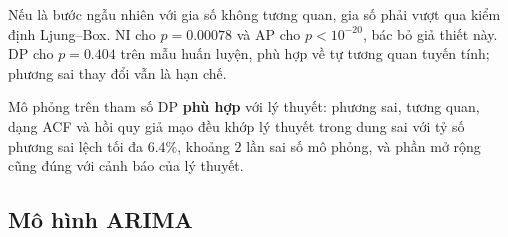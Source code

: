 Nếu là bước ngẫu nhiên với gia số không tương quan, gia số phải vượt qua kiểm định Ljung--Box. NI cho $p=0.00078$ và AP cho $p<10^{-20}$, bác bỏ giả thiết này. DP cho $p=0.404$ trên mẫu huấn luyện, phù hợp về tự tương quan tuyến tính; phương sai thay đổi vẫn là hạn chế.

 Mô phỏng trên tham số DP \textbf{phù hợp} với lý thuyết: phương sai, tương quan, dạng ACF và hồi quy giả mạo đều khớp lý thuyết trong dung sai với tỷ số phương sai lệch tối đa $6.4\%$, khoảng $2$ lần sai số mô phỏng, và phần mở rộng cũng đúng với cảnh báo của lý thuyết.

\subsection{Mô hình ARIMA}

